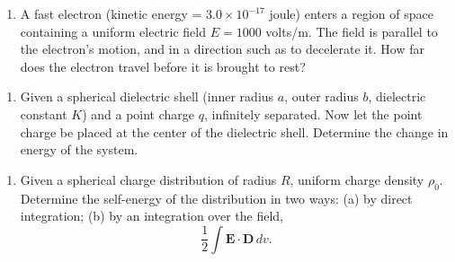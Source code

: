 \documentclass{article}
\begin{document}
\begin{enumerate}[label={{\textcolor{trueblue}{\textbf{Pr.} \arabic*.10}}}]
\item A fast electron (kinetic energy = $3.0 \times 10^{-17}$ joule) enters a region of space containing a uniform electric field $E = 1000$ volts/m. The field is parallel to the electron’s motion, and in a direction such as to decelerate it. How far does the electron travel before it is brought to rest?
\end{enumerate}

\begin{enumerate}[label={{\textcolor{trueblue}{\textbf{Pr.} \arabic*.11}}}]
\item Given a spherical dielectric shell (inner radius $a$, outer radius $b$, dielectric constant $K$) and a point charge $q$, infinitely separated. Now let the point charge be placed at the center of the dielectric shell. Determine the change in energy of the system.
\end{enumerate}

\begin{enumerate}[label={{\textcolor{trueblue}{\textbf{Pr.} \arabic*.12}}}]
\item Given a spherical charge distribution of radius $R$, uniform charge density $\rho_{0}$. Determine the self-energy of the distribution in two ways:  
(a) by direct integration;  
(b) by an integration over the field,
\[
\frac{1}{2} \int \mathbf{E}\cdot \mathbf{D}\, dv.
\]
\end{enumerate}




\tableofcontents \newpage

\begin{center}
\end{center}  \vspace{2cm}
\end{document}
